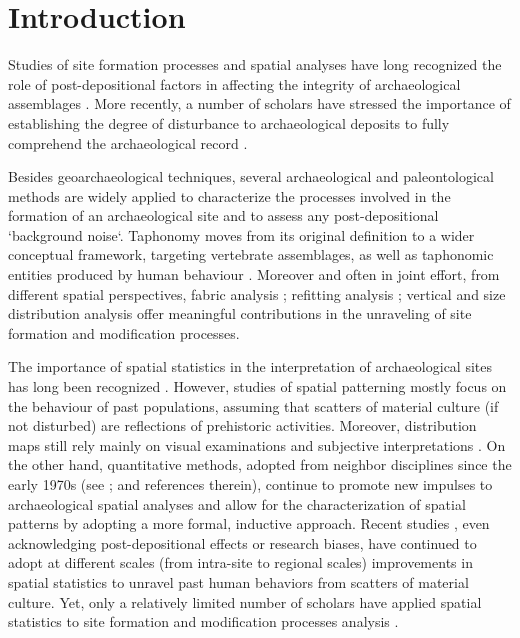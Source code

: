 \documentclass[5p,authoryear]{elsarticle} %
\begin{document}

\section{Introduction}

Studies of site formation processes and spatial analyses have long recognized the role of post-depositional factors in affecting the integrity of archaeological assemblages \citep{Hodder1976,Petraglia1987,Schick1984,Schick1986,Schiffer1972,Schiffer1983,Schiffer1987,Wood1978}. More recently, a number of scholars have stressed the importance of establishing the degree of disturbance to archaeological deposits to fully comprehend the archaeological record \citep{Dibble1997,Djindjian1999,Texier2000}.

Besides geoarchaeological techniques, several archaeological and paleontological methods are widely applied to characterize the processes involved in the formation of an archaeological site and to assess any post-depositional `background noise`. Taphonomy moves from its original definition \citep{Efremov1940} to a wider conceptual framework, targeting vertebrate assemblages, as well as taphonomic entities produced by human behaviour \citep{Dominguez-Rodrigo2011}. Moreover and often in joint effort, from different spatial perspectives, fabric analysis \citep{Benito-Calvo2011,Bernatchez2010,Bertran1997,Bertran1995,Dominguez-Rodrigo2014,Lenoble2004,McPherron2005,Torre2013a}; refitting analysis \citep{Lopez-Ortega2011,Sisk2008,Villa1982}; vertical \citep{Anderson2008} and size distribution analysis \citep{Bertran2006,Bertran2012,Petraglia1994} offer meaningful contributions in the unraveling of site formation and modification processes.

The importance of spatial statistics in the interpretation of archaeological sites has long been recognized \citep{Hodder1976,Whallon1974}. However, studies of spatial patterning mostly focus on the behaviour of past populations, assuming that scatters of material culture (if not disturbed) are reflections of prehistoric activities. Moreover, distribution maps still rely mainly on visual examinations and subjective interpretations \citep{Bevan2013a}. On the other hand, quantitative methods, adopted from neighbor disciplines since the early 1970s (see \cite{Hodder1976,Orton1982}; and references therein), continue to promote new impulses to archaeological spatial analyses and allow for the characterization of spatial patterns by adopting a more formal, inductive approach. Recent studies \citep{Bevan2006,Bevan2009,Bevan2013c,Bevan2013a,Bevan2013,Crema2015,Crema2010,Crema2013,Eve2014,Orton2004}, even acknowledging post-depositional effects or research biases, have continued to adopt at different scales (from intra-site to regional scales) improvements in spatial statistics to unravel past human behaviors from scatters of material culture. Yet, only a relatively limited number of scholars have applied spatial statistics to site formation and modification processes analysis \citep{Carrer2015,Dominguez-Rodrigo2014b,Dominguez-Rodrigo2014c}.
\end{document}
